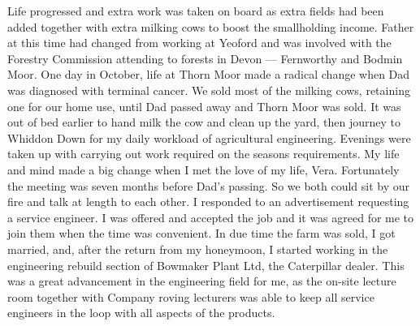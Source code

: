 Life progressed and extra work was taken on board as extra fields had been added
together with extra milking cows to boost the smallholding income. Father at
this time had changed from working at Yeoford and was involved with the
Forestry Commission attending to forests in Devon --- Fernworthy and Bodmin
Moor. One day in October, life at Thorn Moor made a radical change when Dad was
diagnosed with terminal cancer. We sold most of the milking cows, retaining one
for our home use, until Dad passed away and Thorn Moor was sold. It was out of
bed earlier to hand milk the cow and clean up the yard, then journey to Whiddon
Down for my daily workload of agricultural engineering. Evenings were taken up
with carrying out work required on the seasons requirements. My life and mind
made a big change when I met the love of my life, Vera. Fortunately the meeting
was seven months before Dad's passing. So we both could sit by our fire and
talk at length to each other. I responded to an advertisement requesting a
service engineer. I was offered and accepted the job and it was agreed for me
to join them when the time was convenient. In due time the farm was sold, I got
married, and, after the return from my honeymoon, I started working in the
engineering rebuild section of Bowmaker Plant Ltd, the Caterpillar dealer. This
was a great advancement in the engineering field for me, as the on-site lecture
room together with Company roving lecturers was able to keep all service
engineers in the loop with all aspects of the products.
